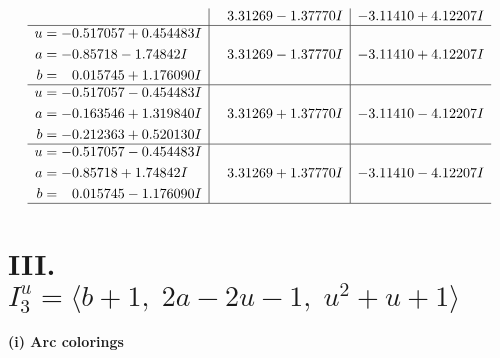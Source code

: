\documentclass[1p]{elsarticle_modified}
\theoremstyle{definition}
\begin{document}
$$\begin{array}{c|c|c}
 & \phantom{-}3.31269 - 1.37770 I & -3.11410 + 4.12207 I \\ \hline\begin{aligned}
u &= -0.517057 + 0.454483 I \\
a &= -0.85718 - 1.74842 I \\
b &= \phantom{-}0.015745 + 1.176090 I\end{aligned}
 & \phantom{-}3.31269 - 1.37770 I & -3.11410 + 4.12207 I \\ \hline\begin{aligned}
u &= -0.517057 - 0.454483 I \\
a &= -0.163546 + 1.319840 I \\
b &= -0.212363 + 0.520130 I\end{aligned}
 & \phantom{-}3.31269 + 1.37770 I & -3.11410 - 4.12207 I \\ \hline\begin{aligned}
u &= -0.517057 - 0.454483 I \\
a &= -0.85718 + 1.74842 I \\
b &= \phantom{-}0.015745 - 1.176090 I\end{aligned}
 & \phantom{-}3.31269 + 1.37770 I & -3.11410 - 4.12207 I\\
 \hline 
 \end{array}$$\newpage\newpage\renewcommand{\arraystretch}{1}
\centering \section*{III. $I^u_{3}= \langle b+1,\;2 a-2 u-1,\;u^2+u+1 \rangle$}
\flushleft \textbf{(i) Arc colorings}\\
\end{document}
